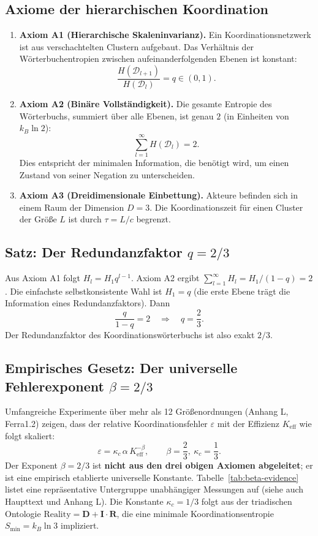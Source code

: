 \documentclass[11pt,a4paper]{article}
\begin{document}
	\subsection{Axiome der hierarchischen Koordination}
	
	\begin{enumerate}
		\item \textbf{Axiom A1 (Hierarchische Skaleninvarianz).} Ein Koordinationsnetzwerk ist aus verschachtelten Clustern aufgebaut. Das Verhältnis der Wörterbuchentropien zwischen aufeinanderfolgenden Ebenen ist konstant:
		\[
		\frac{H(\mathcal{D}_{l+1})}{H(\mathcal{D}_l)} = q \in (0,1).
		\]
		
		\item \textbf{Axiom A2 (Binäre Vollständigkeit).} Die gesamte Entropie des Wörterbuchs, summiert über alle Ebenen, ist genau \(2\) (in Einheiten von \(k_B\ln 2\)):
		\[
		\sum_{l=1}^{\infty} H(\mathcal{D}_l) = 2.
		\]
		Dies entspricht der minimalen Information, die benötigt wird, um einen Zustand von seiner Negation zu unterscheiden.
		
		\item \textbf{Axiom A3 (Dreidimensionale Einbettung).} Akteure befinden sich in einem Raum der Dimension \(D=3\). Die Koordinationszeit für einen Cluster der Größe \(L\) ist durch \(\tau = L/c\) begrenzt.
	\end{enumerate}
	
	\subsection{Satz: Der Redundanzfaktor \(q = 2/3\)}
	
	Aus Axiom A1 folgt \(H_l = H_1 q^{l-1}\). Axiom A2 ergibt \(\sum_{l=1}^\infty H_l = H_1/(1-q) = 2\). Die einfachste selbstkonsistente Wahl ist \(H_1 = q\) (die erste Ebene trägt die Information eines Redundanzfaktors). Dann
	\[
	\frac{q}{1-q} = 2 \quad\Longrightarrow\quad \boxed{q = \frac{2}{3}}.
	\]
	Der Redundanzfaktor des Koordinationswörterbuchs ist also exakt \(2/3\).
	
	\subsection{Empirisches Gesetz: Der universelle Fehlerexponent \(\beta = 2/3\)}
	
	Umfangreiche Experimente über mehr als 12 Größenordnungen (Anhang L, Ferra1.2) zeigen, dass der relative Koordinationsfehler \(\varepsilon\) mit der Effizienz \(K_{\mathrm{eff}}\) wie folgt skaliert:
	\[
	\varepsilon = \kappa_c \, \alpha \, K_{\mathrm{eff}}^{-\beta}, \qquad \boxed{\beta = \frac{2}{3}},\ \kappa_c = \frac{1}{3}.
	\]
	Der Exponent \(\beta = 2/3\) ist \textbf{nicht aus den drei obigen Axiomen abgeleitet}; er ist eine empirisch etablierte universelle Konstante. Tabelle~\ref{tab:beta-evidence} listet eine repräsentative Untergruppe unabhängiger Messungen auf (siehe auch Haupttext und Anhang L). Die Konstante \(\kappa_c = 1/3\) folgt aus der triadischen Ontologie \(\text{Reality} = \mathbf{D} + \mathbf{I}\!\cdot\!\mathbf{R}\), die eine minimale Koordinationsentropie \(S_{\min}=k_B\ln 3\) impliziert.
	
\end{document}
